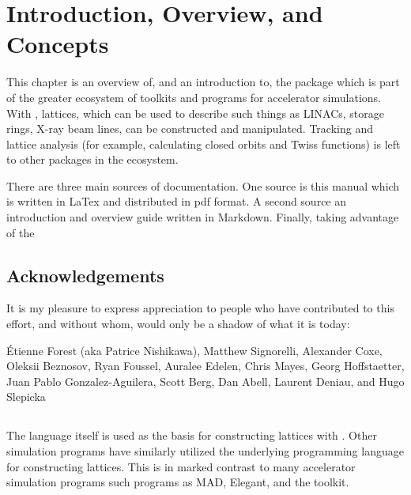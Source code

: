 \chapter{Introduction, Overview, and Concepts}

This chapter is an overview of, and an introduction to, the \accellat package which is part of the
greater \bmadjl ecosystem of toolkits  and programs for accelerator simulations. With \accellat,
lattices, which can be used to describe such
things as LINACs, storage rings, X-ray beam lines,
can be constructed and manipulated. Tracking and lattice analysis (for example, calculating
closed orbits and Twiss functions) is left to other packages in the \bmadjl ecosystem.

There are three main sources of documentation. One source is this manual which is written in LaTex
and distributed in pdf format. A second source an introduction and overview guide written in Markdown.
Finally, taking advantage of the 

\section{Acknowledgements}

It is my pleasure to express appreciation to people who have contributed to this effort, and without
whom, \bmadjl would only be a shadow of what it is today: 

\'Etienne Forest (aka Patrice Nishikawa),
Matthew Signorelli,
Alexander Coxe,
Oleksii Beznosov,
Ryan Foussel,
Auralee Edelen,
Chris Mayes,
Georg Hoffstaetter,
Juan Pablo Gonzalez-Aguilera,
Scott Berg,
Dan Abell,
Laurent Deniau, and
Hugo Slepicka

\section{}


The \julia language itself is used as the basis for constructing lattices with \accellat. 
Other simulation programs
have similarly utilized the underlying programming language for constructing 
lattices\cite{Appleby:Merlin2020,Iadarola:Xsuite2023}. This is in marked contrast to many accelerator
simulation programs such programs as MAD\cite{Grote:MAD1989}, Elegant\cite{Borland:Elegant2000}, and the 
\bmad toolkit\cite{Sagan:Bmad2006}. 



